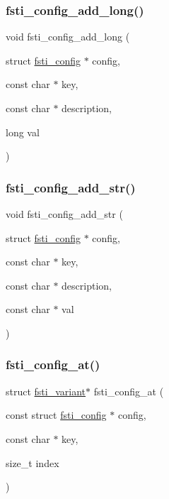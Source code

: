 \subsubsection{\texorpdfstring{fsti\+\_\+config\+\_\+add\+\_\+long()}{fsti\_config\_add\_long()}}
{\footnotesize\ttfamily void fsti\+\_\+config\+\_\+add\+\_\+long (\begin{DoxyParamCaption}\item[{struct \mbox{\hyperlink{structfsti__config}{fsti\+\_\+config}} $\ast$}]{config,  }\item[{const char $\ast$}]{key,  }\item[{const char $\ast$}]{description,  }\item[{long}]{val }\end{DoxyParamCaption})}

\mbox{\label{fsti-config_8c_a3ee06dfcfc2e683469ca7ed25f9dc7a4}} 
\subsubsection{\texorpdfstring{fsti\+\_\+config\+\_\+add\+\_\+str()}{fsti\_config\_add\_str()}}
{\footnotesize\ttfamily void fsti\+\_\+config\+\_\+add\+\_\+str (\begin{DoxyParamCaption}\item[{struct \mbox{\hyperlink{structfsti__config}{fsti\+\_\+config}} $\ast$}]{config,  }\item[{const char $\ast$}]{key,  }\item[{const char $\ast$}]{description,  }\item[{const char $\ast$}]{val }\end{DoxyParamCaption})}

\mbox{\label{fsti-config_8c_a7e65ede372ff1c72a9eb5e6c26f499e4}} 
\subsubsection{\texorpdfstring{fsti\+\_\+config\+\_\+at()}{fsti\_config\_at()}}
{\footnotesize\ttfamily struct \mbox{\hyperlink{structfsti__variant}{fsti\+\_\+variant}}$\ast$ fsti\+\_\+config\+\_\+at (\begin{DoxyParamCaption}\item[{const struct \mbox{\hyperlink{structfsti__config}{fsti\+\_\+config}} $\ast$}]{config,  }\item[{const char $\ast$}]{key,  }\item[{size\+\_\+t}]{index }\end{DoxyParamCaption})}

